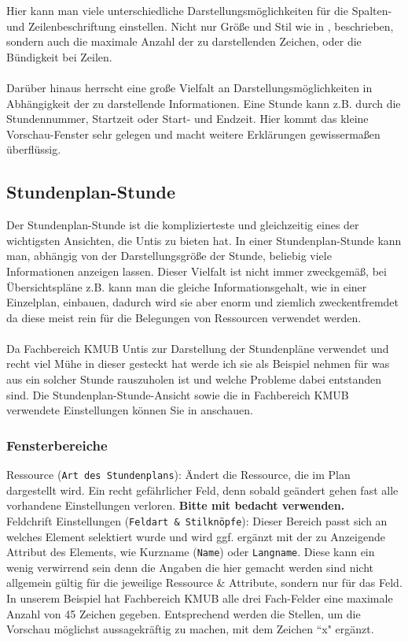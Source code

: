 Hier kann man viele unterschiedliche Darstellungsmöglichkeiten für die Spalten- und Zeilenbeschriftung einstellen. Nicht nur Größe und Stil wie in , beschrieben, sondern auch die maximale Anzahl der zu darstellenden Zeichen, oder die Bündigkeit bei Zeilen.\\
\\
Darüber hinaus herrscht eine große Vielfalt an Darstellungsmöglichkeiten in Abhängigkeit der zu darstellende Informationen. Eine Stunde kann z.B. durch die Stundennummer, Startzeit oder Start- und Endzeit. Hier kommt das kleine Vorschau-Fenster sehr gelegen und macht weitere Erklärungen gewissermaßen überflüssig.

\subsection{Stundenplan-Stunde}
\label{sec:stundenplan-stunde}

Der Stundenplan-Stunde ist die komplizierteste und gleichzeitig eines der wichtigsten Ansichten, die Untis zu bieten hat. In einer Stundenplan-Stunde kann man, abhängig von der Darstellungsgröße der Stunde, beliebig viele Informationen anzeigen lassen. Dieser Vielfalt ist nicht immer zweckgemäß, bei Übersichtspläne z.B. kann man die gleiche Informationsgehalt, wie in einer Einzelplan, einbauen, dadurch wird sie aber enorm und ziemlich zweckentfremdet da diese meist rein für die Belegungen von Ressourcen verwendet werden.\\
\\
Da Fachbereich KMUB Untis zur Darstellung der Stundenpläne verwendet und recht viel Mühe in dieser gesteckt hat werde ich sie als Beispiel nehmen für was aus ein solcher Stunde rauszuholen ist und welche Probleme dabei entstanden sind. Die Stundenplan-Stunde-Ansicht sowie die in Fachbereich KMUB verwendete Einstellungen können Sie in  anschauen.

\subsubsection{Fensterbereiche}

\noindent
Ressource (\texttt{Art des Stundenplans}): Ändert die Ressource, die im Plan dargestellt wird. Ein recht gefährlicher Feld, denn sobald geändert gehen fast alle vorhandene Einstellungen verloren. \textbf{Bitte mit bedacht verwenden.}\\

\noindent
Feldchrift Einstellungen (\texttt{Feldart \& Stilknöpfe}): Dieser Bereich passt sich an welches Element selektiert wurde und wird ggf. ergänzt mit der zu Anzeigende Attribut des Elements, wie Kurzname (\texttt{Name}) oder \texttt{Langname}. Diese kann ein wenig verwirrend sein denn die Angaben die hier gemacht werden sind nicht allgemein gültig für die jeweilige Ressource \& Attribute, sondern nur für das Feld. In unserem Beispiel hat Fachbereich KMUB alle drei Fach-Felder eine maximale Anzahl von 45 Zeichen gegeben. Entsprechend werden die Stellen, um die Vorschau möglichst aussagekräftig zu machen, mit dem Zeichen ``x" \hspace{1pt} ergänzt.\\

